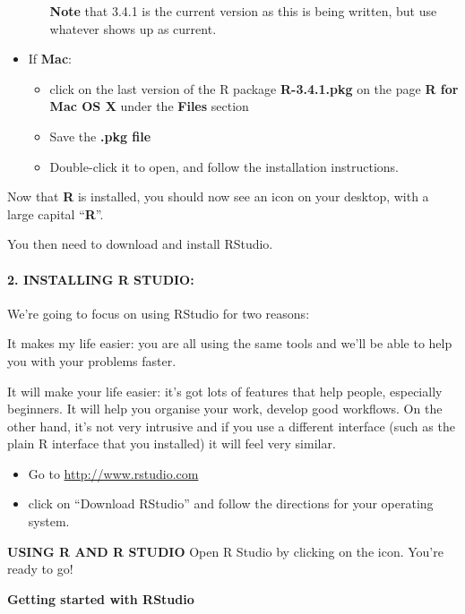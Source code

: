 \documentclass[]{article}
\providecommand{\tightlist}{%
  \setlength{\itemsep}{0pt}\setlength{\parskip}{0pt}}
\let\oldparagraph\paragraph
\renewcommand{\paragraph}[1]{\oldparagraph{#1}\mbox{}}
\begin{document}
\begin{itemize}
\begin{itemize}
    \textbf{Note} that 3.4.1 is the current version as this is being
    written, but use whatever shows up as current.
  \end{itemize}
\item
  If \textbf{Mac}:

  \begin{itemize}
  \tightlist
  \item
    click on the last version of the R package \textbf{R-3.4.1.pkg} on
    the page \textbf{R for Mac OS X} under the \textbf{Files} section
  \item
    Save the \textbf{.pkg file}
  \item
    Double-click it to open, and follow the installation instructions.
  \end{itemize}
\end{itemize}

Now that \textbf{R} is installed, you should now see an icon on your
desktop, with a large capital ``\textbf{R}''.

You then need to download and install RStudio.

\paragraph{\texorpdfstring{\textbf{2. INSTALLING R
STUDIO:}}{2. INSTALLING R STUDIO:}}\label{installing-r-studio}

We're going to focus on using RStudio for two reasons:

It makes my life easier: you are all using the same tools and we'll be
able to help you with your problems faster.

It will make your life easier: it's got lots of features that help
people, especially beginners. It will help you organise your work,
develop good workflows. On the other hand, it's not very intrusive and
if you use a different interface (such as the plain R interface that you
installed) it will feel very similar.

\begin{itemize}
\tightlist
\item
  Go to \url{http://www.rstudio.com}
\item
  click on ``Download RStudio'' and follow the directions for your
  operating system.
\end{itemize}

\textbf{USING R AND R STUDIO} Open R Studio by clicking on the icon.
You're ready to go!

\textbf{Getting started with RStudio}
\end{document}
